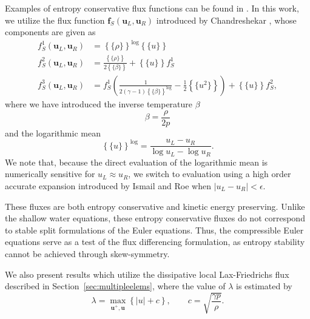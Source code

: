 \documentclass[preprint,10pt]{article}
\theoremstyle{definition}
\theoremstyle{lemma}
\theoremstyle{theorem}
\theoremstyle{assumption}
\newcommand{\LRp}[1]{\left( #1 \right)}
\newcommand{\LRb}[1]{\left| #1 \right|}
\newcommand{\LRc}[1]{\left\{ #1 \right\}}
\newcommand{\avg}[1] {\ensuremath{\LRc{\!\{#1\}\!}}}
\begin{document}
Examples of entropy conservative flux functions can be found in \cite{ismail2009affordable, chandrashekar2013kinetic}.  In this work, we utilize the flux function $\bm{f}_S(\bm{u}_L,\bm{u}_R)$ introduced by Chandreshekar \cite{chandrashekar2013kinetic}, whose components are given as
\begin{align*}
f^1_S(\bm{u}_L,\bm{u}_R) &= \avg{\rho}^{\log} \avg{u}\\
f^2_S(\bm{u}_L,\bm{u}_R) &= \frac{\avg{\rho}}{2\avg{\beta}} + \avg{u}f^1_S\\
f^3_S(\bm{u}_L,\bm{u}_R) &= f^1_S\LRp{\frac{1}{2(\gamma-1)\avg{\beta}^{\log}} - \frac{1}{2}\avg{u^2}} + \avg{u}f^2_S,
\end{align*}
where we have introduced the inverse temperature $\beta$
\[
\beta = \frac{\rho}{2p}
\]
and the logarithmic mean
\[
\avg{u}^{\log} = \frac{u_L - u_R}{\log{u_L}- \log{u_R}}.  
\]
We note that, because the direct evaluation of the logarithmic mean is numerically sensitive for $u_L\approx u_R$, we switch to evaluation using a high order accurate expansion introduced by Ismail and Roe \cite{ismail2009affordable} when $\LRb{u_L-u_R}<\epsilon$.  

These fluxes are both entropy conservative and kinetic energy preserving.  Unlike the shallow water equations, these entropy conservative fluxes do not correspond to stable split formulations of the Euler equations.  Thus, the compressible Euler equations serve as a test of the flux differencing formulation, as entropy stability cannot be achieved through skew-symmetry.  

We also present results which utilize the dissipative local Lax-Friedrichs flux described in Section~\ref{sec:multipleelems}, where the value of $\lambda$ is estimated by
\[
\lambda = \max_{\bm{u}^+, \bm{u}} \LRc{\LRb{u} + c}, 
\qquad c = \sqrt{\frac{\gamma p}{\rho}}.
\]
\end{document}
